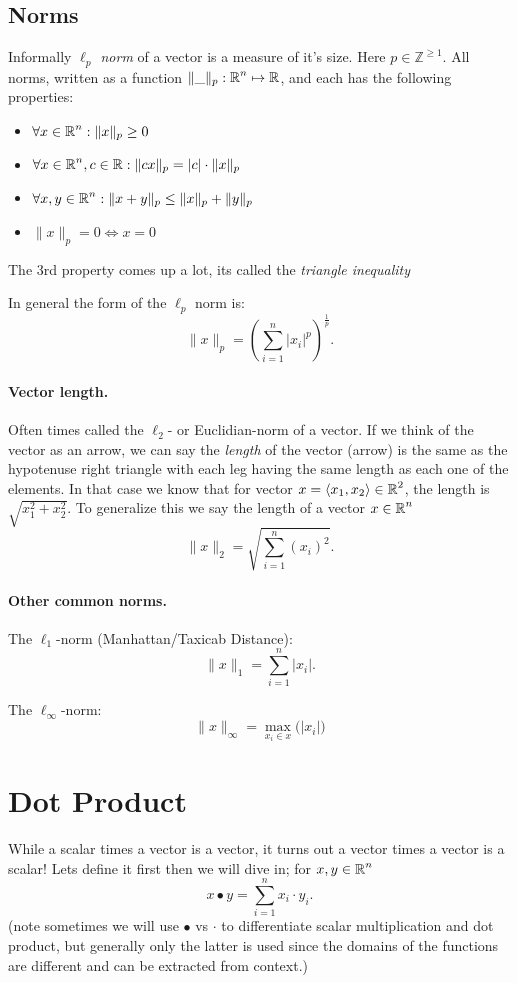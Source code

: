 \subsection{Norms}
Informally \emph{$\ell_p$ norm} of a vector is a measure of it's size.
Here $p\in\mathbb{Z}^{\ge1}$.  
All norms, written as a function $\|\_\|_p: \operatorname{\mathbb{R}}^n \mapsto \operatorname{\mathbb{R}}$, and each has the following properties:
\begin{itemize}
\item $\forall x \in \operatorname{\mathbb{R}}^n : \|x\|_p\ge 0$
\item $\forall x \in \operatorname{\mathbb{R}}^n, c\in\operatorname{\mathbb{R}} : \|cx\|_p = |c|\cdot\|x\|_p$ 
\item $\forall x,y \in \operatorname{\mathbb{R}}^n : \|x+y\|_p\le \|x\|_p + \|y\|_p$
\item $\|x\|_p = 0 \iff x=0$
\end{itemize}

The 3rd property comes up a lot, its called the \emph{triangle inequality}

In general the form of the $\ell_p$ norm is:
\[
\|x\|_p = \left(\sum_{i=1}^n \left|x_i\right|^p\right)^{\frac{1}{p}}.
\]



\paragraph{Vector length.} Often times called the $\ell_2$- or Euclidian-norm of a vector. 
If we think of the vector as an arrow, we can say the \emph{length} of the vector (arrow) is the same as the hypotenuse 
right triangle with each leg having the same length as each one of the elements. 
In that case we know that for vector $x = \left\langle x_1,x_2\right\rangle\in\operatorname{\mathbb{R}}^2$, the length is $\sqrt{x_1^2 + x_2^2}$.
To generalize this we say the length of a vector $x\in\operatorname{\mathbb{R}}^n$
\[
\|x\|_2 = \sqrt{\sum_{i=1}^n \left(x_i\right)^2}.
\]

\paragraph{Other common norms.}
The $\ell_1$-norm (Manhattan/Taxicab Distance):
\[
\|x\|_1 = \sum_{i=1}^n \left|x_i\right|.
\]

The $\ell_\infty$-norm: 
\[
\|x\|_\infty = \max_{x_i \in x} \big(\left|x_i\right|\big)
\]


\section{Dot Product}
While a scalar times a vector is a vector, it turns out a vector times a vector is a scalar! 
Lets define it first then we will dive in;
for $x,y \in \operatorname{\mathbb{R}}^n$
\[
x \bullet y = \sum_{i=1}^n x_i \cdot y_i.
\]
(note sometimes we will use $\bullet$ vs $\cdot$ to differentiate scalar multiplication and dot product, but generally only the latter is used since the domains of the functions are different and can be extracted from context.)

